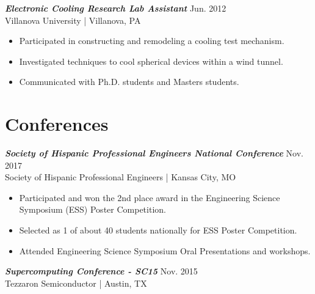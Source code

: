 \documentclass[letter]{res}
\begin{document}
\begin{resume}
\vspace{-2mm}

{\sl \textbf{Electronic Cooling Research Lab Assistant}} \hfill Jun. 2012\\
Villanova University | Villanova, PA \newline
 
 \vspace{-4mm}
 
 \begin{itemize}
 \item Participated in constructing and remodeling a cooling test mechanism.
 \item Investigated techniques to cool spherical devices within a wind tunnel.
 \item Communicated with Ph.D. students and Masters students.
 \end{itemize}
 
\vspace{-4mm}

\section{Conferences}

{\sl \textbf{Society of Hispanic Professional Engineers National Conference}} \hfill Nov. 2017\\
 Society of Hispanic Professional Engineers | Kansas City, MO \newline

 \vspace{-4mm}

 \begin{itemize}
 \item Participated and won the 2nd place award in the Engineering Science Symposium (ESS) Poster Competition.
 \item Selected as 1 of about 40 students nationally for ESS Poster Competition.
 \item Attended Engineering Science Symposium Oral Presentations and workshops.
 \end{itemize}
 
\vspace{-2mm}

{\sl \textbf{Supercomputing Conference - SC15}} \hfill Nov. 2015\\
Tezzaron Semiconductor | Austin, TX \newline

 \vspace{-4mm}


\end{resume}
\end{document}
